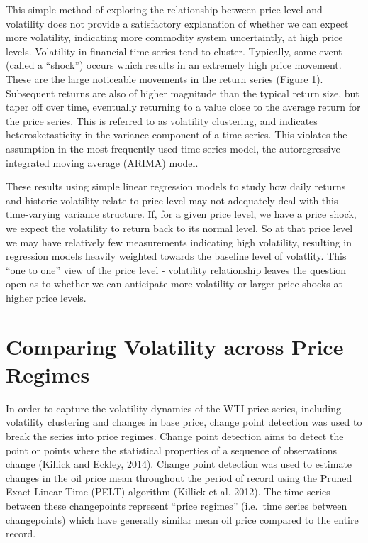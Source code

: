 \documentclass[]{article}
\begin{document}
This simple method of exploring the relationship between price level and
volatility does not provide a satisfactory explanation of whether we can
expect more volatility, indicating more commodity system uncertaintly,
at high price levels. Volatility in financial time series tend to
cluster. Typically, some event (called a ``shock'') occurs which results
in an extremely high price movement. These are the large noticeable
movements in the return series (Figure 1). Subsequent returns are also
of higher magnitude than the typical return size, but taper off over
time, eventually returning to a value close to the average return for
the price series. This is referred to as volatility clustering, and
indicates heterosketasticity in the variance component of a time series.
This violates the assumption in the most frequently used time series
model, the autoregressive integrated moving average (ARIMA) model.

These results using simple linear regression models to study how daily
returns and historic volatility relate to price level may not adequately
deal with this time-varying variance structure. If, for a given price
level, we have a price shock, we expect the volatility to return back to
its normal level. So at that price level we may have relatively few
measurements indicating high volatility, resulting in regression models
heavily weighted towards the baseline level of volatlity. This ``one to
one'' view of the price level - volatility relationship leaves the
question open as to whether we can anticipate more volatility or larger
price shocks at higher price levels.

\section{Comparing Volatility across Price
Regimes}\label{comparing-volatility-across-price-regimes}

In order to capture the volatility dynamics of the WTI price series,
including volatility clustering and changes in base price, change point
detection was used to break the series into price regimes. Change point
detection aims to detect the point or points where the statistical
properties of a sequence of observations change (Killick and Eckley,
2014). Change point detection was used to estimate changes in the oil
price mean throughout the period of record using the Pruned Exact Linear
Time (PELT) algorithm (Killick et al. 2012). The time series between
these changepoints represent ``price regimes'' (i.e.~time series between
changepoints) which have generally similar mean oil price compared to
the entire record.
\end{document}
